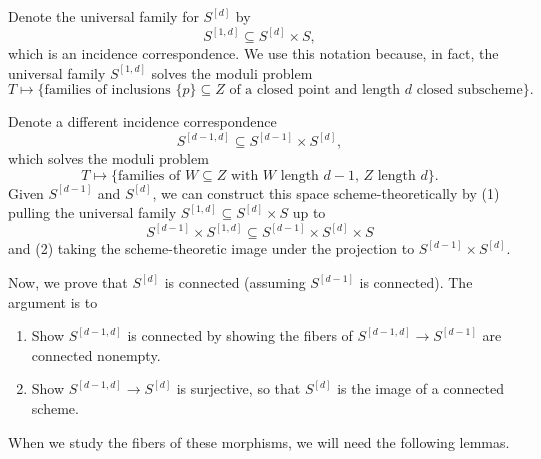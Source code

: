 \documentclass[12pt]{article}
\begin{document}
Denote the universal family for $S^{[d]}$ by
\[S^{[1,d]} \subseteq S^{[d]} \times S,\]
which is an incidence correspondence. We use this notation because, in fact, the universal family $S^{[1,d]}$ solves the moduli problem
\[T \mapsto \{\text{families of inclusions $\{p\}\subseteq Z$ of a closed point and length $d$ closed subscheme}\}.\]

Denote a different incidence correspondence
\[S^{[d-1,d]} \subseteq S^{[d-1]} \times S^{[d]},\]
which solves the moduli problem 
\[T \mapsto \{\text{families of $W\subseteq Z$ with $W$ length $d-1$, $Z$ length $d$}\}.\]
Given $S^{[d-1]}$ and $S^{[d]}$, we can construct this space scheme-theoretically by (1) pulling the universal family $S^{[1,d]}\subseteq S^{[d]} \times S$ up to
\[S^{[d-1]} \times S^{[1,d]} \subseteq S^{[d-1]} \times S^{[d]} \times S\]
and (2) taking the scheme-theoretic image under the projection to $S^{[d-1]}\times S^{[d]}$.

Now, we prove that $S^{[d]}$ is connected (assuming $S^{[d-1]}$ is connected). The argument is to
\begin{enumerate}
    \item Show $S^{[d-1,d]}$ is connected by showing the fibers of $S^{[d-1,d]} \to S^{[d-1]}$ are connected nonempty.
    \item Show $S^{[d-1,d]} \to S^{[d]}$ is surjective, so that $S^{[d]}$ is the image of a connected scheme.
\end{enumerate}

When we study the fibers of these morphisms, we will need the following lemmas.
\end{document}
